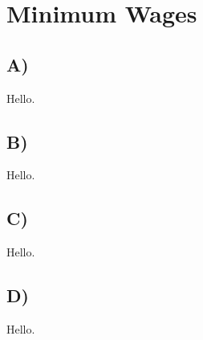 \documentclass[a4paper]{article}
\begin{document}
\section{Minimum Wages}

\subsection*{A)}

Hello.

\subsection*{B)}

Hello.

\subsection*{C)}

Hello.

\subsection*{D)}

Hello.
\end{document}
